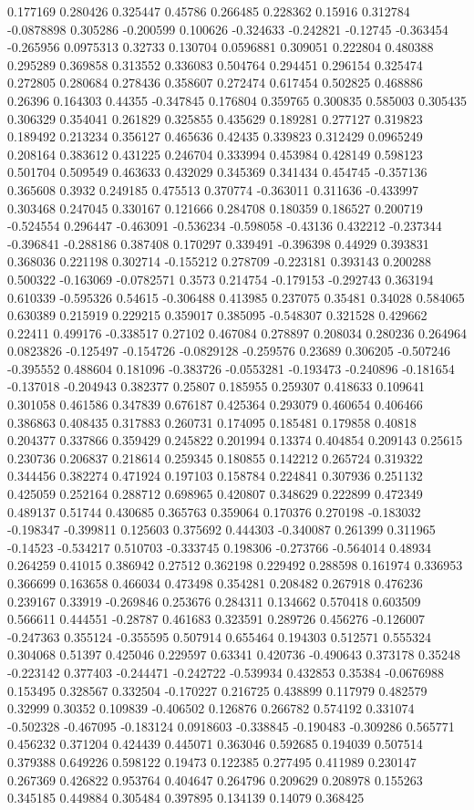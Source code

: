 0.177169 0.280426 0.325447 0.45786 0.266485 0.228362 0.15916 0.312784 -0.0878898 0.305286 -0.200599 0.100626 -0.324633 -0.242821 -0.12745 -0.363454 -0.265956 0.0975313 0.32733 0.130704 0.0596881 0.309051 0.222804 0.480388 0.295289 0.369858 0.313552 0.336083 0.504764 0.294451 0.296154 0.325474 0.272805 0.280684 0.278436 0.358607 0.272474 0.617454 0.502825 0.468886 0.26396 0.164303 0.44355 -0.347845 0.176804 0.359765 0.300835 0.585003 0.305435 0.306329 0.354041 0.261829 0.325855 0.435629 0.189281 0.277127 0.319823 0.189492 0.213234 0.356127 0.465636 0.42435 0.339823 0.312429 0.0965249 0.208164 0.383612 0.431225 0.246704 0.333994 0.453984 0.428149 0.598123 0.501704 0.509549 0.463633 0.432029 0.345369 0.341434 0.454745 -0.357136 0.365608 0.3932 0.249185 0.475513 0.370774 -0.363011 0.311636 -0.433997 0.303468 0.247045 0.330167 0.121666 0.284708 0.180359 0.186527 0.200719 -0.524554 0.296447 -0.463091 -0.536234 -0.598058 -0.43136 0.432212 -0.237344 -0.396841 -0.288186 0.387408 0.170297 0.339491 -0.396398 0.44929 0.393831 0.368036 0.221198 0.302714 -0.155212 0.278709 -0.223181 0.393143 0.200288 0.500322 -0.163069 -0.0782571 0.3573 0.214754 -0.179153 -0.292743 0.363194 0.610339 -0.595326 0.54615 -0.306488 0.413985 0.237075 0.35481 0.34028 0.584065 0.630389 0.215919 0.229215 0.359017 0.385095 -0.548307 0.321528 0.429662 0.22411 0.499176 -0.338517 0.27102 0.467084 0.278897 0.208034 0.280236 0.264964 0.0823826 -0.125497 -0.154726 -0.0829128 -0.259576 0.23689 0.306205 -0.507246 -0.395552 0.488604 0.181096 -0.383726 -0.0553281 -0.193473 -0.240896 -0.181654 -0.137018 -0.204943 0.382377 0.25807 0.185955 0.259307 0.418633 0.109641 0.301058 0.461586 0.347839 0.676187 0.425364 0.293079 0.460654 0.406466 0.386863 0.408435 0.317883 0.260731 0.174095 0.185481 0.179858 0.40818 0.204377 0.337866 0.359429 0.245822 0.201994 0.13374 0.404854 0.209143 0.25615 0.230736 0.206837 0.218614 0.259345 0.180855 0.142212 0.265724 0.319322 0.344456 0.382274 0.471924 0.197103 0.158784 0.224841 0.307936 0.251132 0.425059 0.252164 0.288712 0.698965 0.420807 0.348629 0.222899 0.472349 0.489137 0.51744 0.430685 0.365763 0.359064 0.170376 0.270198 -0.183032 -0.198347 -0.399811 0.125603 0.375692 0.444303 -0.340087 0.261399 0.311965 -0.14523 -0.534217 0.510703 -0.333745 0.198306 -0.273766 -0.564014 0.48934 0.264259 0.41015 0.386942 0.27512 0.362198 0.229492 0.288598 0.161974 0.336953 0.366699 0.163658 0.466034 0.473498 0.354281 0.208482 0.267918 0.476236 0.239167 0.33919 -0.269846 0.253676 0.284311 0.134662 0.570418 0.603509 0.566611 0.444551 -0.28787 0.461683 0.323591 0.289726 0.456276 -0.126007 -0.247363 0.355124 -0.355595 0.507914 0.655464 0.194303 0.512571 0.555324 0.304068 0.51397 0.425046 0.229597 0.63341 0.420736 -0.490643 0.373178 0.35248 -0.223142 0.377403 -0.244471 -0.242722 -0.539934 0.432853 0.35384 -0.0676988 0.153495 0.328567 0.332504 -0.170227 0.216725 0.438899 0.117979 0.482579 0.32999 0.30352 0.109839 -0.406502 0.126876 0.266782 0.574192 0.331074 -0.502328 -0.467095 -0.183124 0.0918603 -0.338845 -0.190483 -0.309286 0.565771 0.456232 0.371204 0.424439 0.445071 0.363046 0.592685 0.194039 0.507514 0.379388 0.649226 0.598122 0.19473 0.122385 0.277495 0.411989 0.230147 0.267369 0.426822 0.953764 0.404647 0.264796 0.209629 0.208978 0.155263 0.345185 0.449884 0.305484 0.397895 0.134139 0.14079 0.368425 